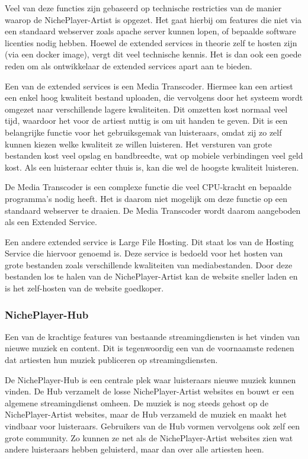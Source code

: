 Veel van deze functies zijn gebaseerd op technische restricties van de manier waarop de NichePlayer-Artist is opgezet. Het gaat hierbij om features die niet via een standaard webserver zoals apache server kunnen lopen, of bepaalde software licenties nodig hebben. Hoewel de extended services in theorie zelf te hosten zijn (via een docker image), vergt dit veel technische kennis. Het is dan ook een goede reden om als ontwikkelaar de extended services apart aan te bieden.

Een van de extended services is een Media Transcoder. Hiermee kan een artiest een enkel hoog kwaliteit bestand uploaden, die vervolgens door het systeem wordt omgezet naar verschillende lagere kwaliteiten. Dit omzetten kost normaal veel tijd, waardoor het voor de artiest nuttig is om uit handen te geven. Dit is een belangrijke functie voor het gebruiksgemak van luisteraars, omdat zij zo zelf kunnen kiezen welke kwaliteit ze willen luisteren. Het versturen van grote bestanden kost veel opslag en bandbreedte, wat op mobiele verbindingen veel geld kost. Als een luisteraar echter thuis is, kan die wel de hoogste kwaliteit luisteren.

De Media Transcoder is een complexe functie die veel CPU-kracht en bepaalde programma's  nodig heeft. Het is daarom niet mogelijk om deze functie op een standaard webserver te draaien. De Media Transcoder wordt daarom aangeboden als een Extended Service.

Een andere extended service is Large File Hosting. Dit staat los van de Hosting Service die hiervoor genoemd is. Deze service is bedoeld voor het hosten van grote bestanden zoals verschillende kwaliteiten van mediabestanden. Door deze bestanden los te halen van de NichePlayer-Artist kan de website sneller laden en is het zelf-hosten van de website goedkoper.

\subsubsection*{NichePlayer-Hub}
Een van de krachtige features van bestaande streamingdiensten is het vinden van nieuwe muziek en content. Dit is tegenwoordig een van de voornaamste redenen dat artiesten hun muziek publiceren op streamingdiensten.

De NichePlayer-Hub is een centrale plek waar luisteraars nieuwe muziek kunnen vinden. De Hub verzamelt de losse NichePlayer-Artist websites en bouwt er een algemene streamingdienst omheen. De muziek is nog steeds gehost op de NichePlayer-Artist websites, maar de Hub verzameld de muziek en maakt het vindbaar voor luisteraars. Gebruikers van de Hub vormen vervolgens ook zelf een grote community. Zo kunnen ze net als de NichePlayer-Artist websites zien wat andere luisteraars hebben geluisterd, maar dan over alle artiesten heen.

